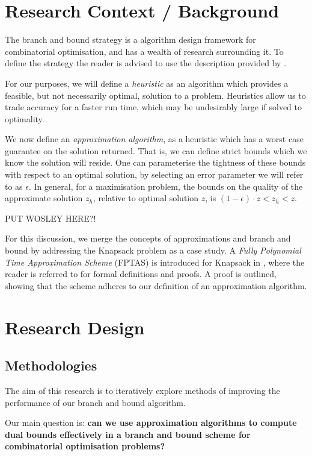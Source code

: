 \documentclass[12pt, a4paper]{article}
\begin{document}
\section{Research Context / Background}

The branch and bound strategy is a algorithm design framework for combinatorial optimisation, and has a wealth of research surrounding it. To define the strategy the reader is advised to use the description provided by \cite{BOOK:1}.

For our purposes, we will define a \textit{heuristic} as an algorithm which provides a feasible, but not necessarily optimal, solution to a problem. Heuristics allow us to trade accuracy for a faster run time, which may be undesirably large if solved to optimality.

We now define an \textit{approximation algorithm}, as a heuristic which has a worst case guarantee on the solution returned. That is, we can define strict bounds which we know the solution will reside. One can parameterise the tightness of these bounds with respect to an optimal solution, by selecting an error parameter we will refer to as $\epsilon$. In general, for a maximisation problem, the bounds on the quality of the approximate solution $z_h$, relative to optimal solution $z$, is $(1-\epsilon)\cdot z < z_h < z$.   

PUT WOSLEY HERE?!

For this discussion, we merge the concepts of approximations and branch and bound by addressing the Knapsack problem as a case study. A \textit{Fully Polynomial Time Approximation Scheme} (FPTAS) is introduced for Knapsack in \cite{BOOK:2}, where the reader is referred to for formal definitions and proofs. A proof is outlined, showing that the scheme adheres to our definition of an approximation algorithm.



\section{Research Design}

\subsection{Methodologies}

The aim of this research is to iteratively explore methods of improving the performance of our branch and bound algorithm. 

Our main question is: \textbf{can we use approximation algorithms to compute dual bounds effectively in a branch and bound scheme for combinatorial optimisation problems?}
\end{document}
